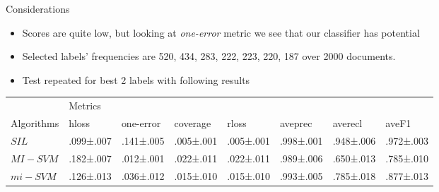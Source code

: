 \begin{frame}{Considerations}
	\begin{itemize}
		\item Scores are quite low, but looking at \textit{one-error} metric we see that our classifier has potential
		\item Selected labels' frequencies are  520, 434, 283, 222, 223, 220, 187 over 2000 documents.
		\item Test repeated for best 2 labels with following results
	\end{itemize}

\begin{tiny}
	\begin{table}[]
\centering
\begin{tabular}{llllllll}
\hline
 & \multicolumn{7}{l}{Metrics} \\ \cline{2-8} 
Algorithms & hloss & one-error & coverage & rloss & aveprec & averecl & aveF1 \\ \hline
$SIL$ & .099±.007 & .141±.005 & .005±.001 & .005±.001 & .998±.001 & .948±.006 & .972±.003 \\
$MI-SVM$ & .182±.007 & .012±.001 & .022±.011 & .022±.011 & .989±.006 & .650±.013 & .785±.010 \\
$mi-SVM$ & .126±.013 & .036±.012 & .015±.010 & .015±.010 & .993±.005 & .785±.018 & .877±.013 \\

\end{tabular}
\end{table}
\end{tiny}

\end{frame}